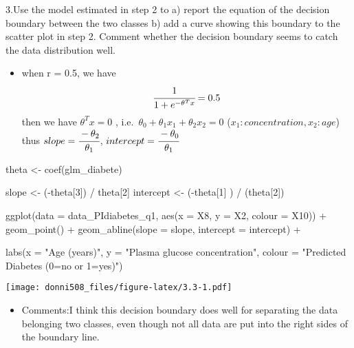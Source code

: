 \documentclass[
]{article}
\newenvironment{Shaded}{\begin{snugshade}}{\end{snugshade}}
\newcommand{\AttributeTok}[1]{\textcolor[rgb]{0.77,0.63,0.00}{#1}}
\newcommand{\DecValTok}[1]{\textcolor[rgb]{0.00,0.00,0.81}{#1}}
\newcommand{\FunctionTok}[1]{\textcolor[rgb]{0.00,0.00,0.00}{#1}}
\newcommand{\NormalTok}[1]{#1}
\newcommand{\OtherTok}[1]{\textcolor[rgb]{0.56,0.35,0.01}{#1}}
\newcommand{\SpecialCharTok}[1]{\textcolor[rgb]{0.00,0.00,0.00}{#1}}
\newcommand{\StringTok}[1]{\textcolor[rgb]{0.31,0.60,0.02}{#1}}
\providecommand{\tightlist}{%
  \setlength{\itemsep}{0pt}\setlength{\parskip}{0pt}}
\begin{document}
3.Use the model estimated in step 2 to a) report the equation of the
decision boundary between the two classes b) add a curve showing this
boundary to the scatter plot in step 2. Comment whether the decision
boundary seems to catch the data distribution well.

\begin{itemize}
\tightlist
\item
  when r = 0.5, we have \[\cfrac{1}{1 + e^{-\theta^T x}} = 0.5\] then we
  have \(\theta^T x = 0\) ,
  i.e.~\(\theta_0 + \theta_1x_1 + \theta_2x_2 =0\)
  (\(x_1: concentration, x_2: age\))\\
  thus \(slope = \cfrac{-\theta_2}{\theta_1}\),
  \(intercept = \cfrac{-\theta_0}{\theta_1}\)
\end{itemize}

\begin{Shaded}
\begin{Highlighting}[]
\NormalTok{theta }\OtherTok{\textless{}{-}} \FunctionTok{coef}\NormalTok{(glm\_diabete)}

\NormalTok{slope }\OtherTok{\textless{}{-}}\NormalTok{ (}\SpecialCharTok{{-}}\NormalTok{theta[}\DecValTok{3}\NormalTok{]) }\SpecialCharTok{/}\NormalTok{ theta[}\DecValTok{2}\NormalTok{]}
\NormalTok{intercept }\OtherTok{\textless{}{-}}\NormalTok{ (}\SpecialCharTok{{-}}\NormalTok{theta[}\DecValTok{1}\NormalTok{] ) }\SpecialCharTok{/}\NormalTok{ (theta[}\DecValTok{2}\NormalTok{]) }

\FunctionTok{ggplot}\NormalTok{(}\AttributeTok{data =}\NormalTok{ data\_PIdiabetes\_q1, }\FunctionTok{aes}\NormalTok{(}\AttributeTok{x =}\NormalTok{ X8, }\AttributeTok{y =}\NormalTok{ X2, }\AttributeTok{colour =}\NormalTok{ X10)) }\SpecialCharTok{+} 
  \FunctionTok{geom\_point}\NormalTok{() }\SpecialCharTok{+} 
  \FunctionTok{geom\_abline}\NormalTok{(}\AttributeTok{slope =}\NormalTok{ slope, }\AttributeTok{intercept =}\NormalTok{ intercept) }\SpecialCharTok{+}
  
  \FunctionTok{labs}\NormalTok{(}\AttributeTok{x =} \StringTok{"Age (years)"}\NormalTok{, }\AttributeTok{y =} \StringTok{"Plasma glucose concentration"}\NormalTok{, }\AttributeTok{colour  =} \StringTok{"Predicted Diabetes (0=no or 1=yes)"}\NormalTok{)}
\end{Highlighting}
\end{Shaded}

\texttt{[image: donni508\_files/figure-latex/3.3-1.pdf]}

\begin{itemize}
\tightlist
\item
  Comments:I think this decision boundary does well for separating the
  data belonging two classes, even though not all data are put into the
  right sides of the boundary line.
\end{itemize}
\end{document}
